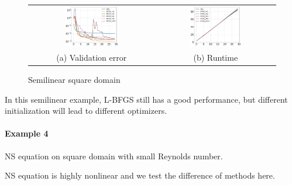 \documentclass{article}
\begin{document}
\begin{figure}[hbt]
    \centering
    \begin{tabular}{cc}
    \includegraphics[width=0.45\textwidth]{figures/semilinear.png}
    &\includegraphics[width=0.45\textwidth]{figures/semilinear_time.png}\\ 
    (a) Validation error & (b) Runtime
    \end{tabular}
    \caption{Semilinear square domain}
\label{fig:semilinear}
\end{figure}

In this semilinear example, L-BFGS still has a good performance, but different initialization will lead to different optimizers.


\paragraph*{Example 4} NS equation on square domain with small Reynolds number.

NS equation is highly nonlinear and we test the difference of methods here.
\end{document}
